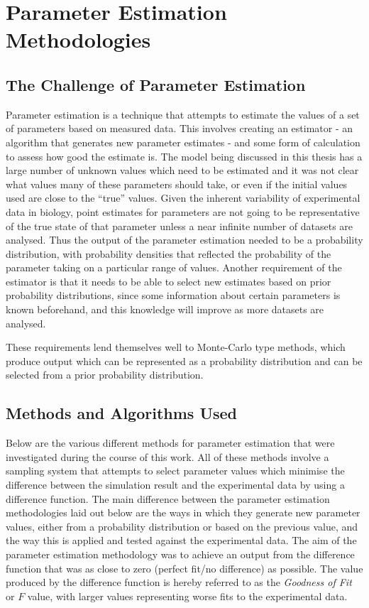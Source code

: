 \chapter{Parameter Estimation Methodologies}
\label{chap:paramest}

\section{The Challenge of Parameter Estimation}
Parameter estimation is a technique that attempts to estimate the values of a set of parameters based on measured data. This involves creating an estimator - an algorithm that generates new parameter estimates - and some form of calculation to assess how good the estimate is. The model being discussed in this thesis has a large number of unknown values which need to be estimated and it was not clear what values many of these parameters should take, or even if the initial values used are close to the ``true'' values. Given the inherent variability of experimental data in biology, point estimates for parameters are not going to be representative of the true state of that parameter unless a near infinite number of datasets are analysed. Thus the output of the parameter estimation needed to be a probability distribution, with probability densities that reflected the probability of the parameter taking on a particular range of values. Another requirement of the estimator is that it needs to be able to select new 
estimates based on prior probability distributions, since some information about certain parameters is known beforehand, and this
knowledge will improve as more datasets are analysed.

These requirements lend themselves well to Monte-Carlo type methods, which produce output which can be represented as a probability distribution and can be selected from a prior probability distribution.

\section{Methods and Algorithms Used}
Below are the various different methods for parameter estimation that were investigated during the course of this work. All of these methods involve a sampling system that attempts to select parameter values which minimise the difference between the simulation result and the experimental data by using a difference function. The main difference between the parameter estimation methodologies laid out below are the ways in which they generate new parameter values, either from a probability distribution or based on the previous value, and the way this is applied and tested against the experimental data. The aim of the parameter estimation methodology was to achieve an output from the difference function that was as close to zero (perfect fit/no difference) as possible. The value produced by the difference function is hereby referred to as the \textit{Goodness of Fit} or $F$ value, with larger values representing worse fits to the experimental data.

